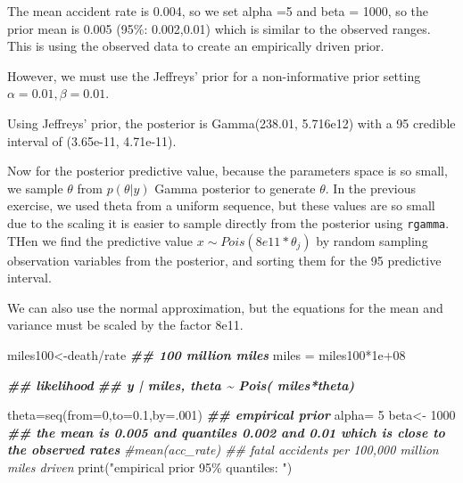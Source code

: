 \documentclass[
]{book}
\newenvironment{Shaded}{\begin{snugshade}}{\end{snugshade}}
\newcommand{\AttributeTok}[1]{\textcolor[rgb]{0.77,0.63,0.00}{#1}}
\newcommand{\CommentTok}[1]{\textcolor[rgb]{0.56,0.35,0.01}{\textit{#1}}}
\newcommand{\DecValTok}[1]{\textcolor[rgb]{0.00,0.00,0.81}{#1}}
\newcommand{\DocumentationTok}[1]{\textcolor[rgb]{0.56,0.35,0.01}{\textbf{\textit{#1}}}}
\newcommand{\FloatTok}[1]{\textcolor[rgb]{0.00,0.00,0.81}{#1}}
\newcommand{\FunctionTok}[1]{\textcolor[rgb]{0.00,0.00,0.00}{#1}}
\newcommand{\NormalTok}[1]{#1}
\newcommand{\OtherTok}[1]{\textcolor[rgb]{0.56,0.35,0.01}{#1}}
\newcommand{\SpecialCharTok}[1]{\textcolor[rgb]{0.00,0.00,0.00}{#1}}
\newcommand{\StringTok}[1]{\textcolor[rgb]{0.31,0.60,0.02}{#1}}
\theoremstyle{definition}
\theoremstyle{definition}
\theoremstyle{definition}
\theoremstyle{definition}
\theoremstyle{remark}
\begin{document}
The mean accident rate is 0.004, so we set alpha =5 and beta = 1000, so the prior mean is 0.005 (95\(\%\): 0.002,0.01) which is similar to the observed ranges. This is using the observed data to create an empirically driven prior.

However, we must use the Jeffreys' prior for a non-informative prior setting \(\alpha=0.01, \beta=0.01\).

Using Jeffreys' prior, the posterior is Gamma(238.01, 5.716e12) with a 95 credible interval of (3.65e-11, 4.71e-11).

Now for the posterior predictive value, because the parameters space is so small, we sample \(\theta\) from \(p(\theta | y)\) Gamma posterior to generate \(\theta\). In the previous exercise, we used theta from a uniform sequence, but these values are so small due to the scaling it is easier to sample directly from the posterior using \texttt{rgamma}. THen we find the predictive value \(x \sim Pois(8e11*\theta_j)\) by random sampling observation variables from the posterior, and sorting them for the 95 predictive interval.

We can also use the normal approximation, but the equations for the mean and variance must be scaled by the factor 8e11.

\begin{Shaded}
\begin{Highlighting}[]
\NormalTok{ miles100}\OtherTok{\textless{}{-}}\NormalTok{death}\SpecialCharTok{/}\NormalTok{rate }\DocumentationTok{\#\# 100 million miles}
\NormalTok{miles }\OtherTok{=}\NormalTok{ miles100}\SpecialCharTok{*}\FloatTok{1e+08}


  
\DocumentationTok{\#\# likelihood   }
\DocumentationTok{\#\# y | miles, theta \textasciitilde{} Pois( miles*theta)}
  
\NormalTok{ theta}\OtherTok{=}\FunctionTok{seq}\NormalTok{(}\AttributeTok{from=}\DecValTok{0}\NormalTok{,}\AttributeTok{to=}\FloatTok{0.1}\NormalTok{,}\AttributeTok{by=}\NormalTok{.}\DecValTok{001}\NormalTok{)}
 \DocumentationTok{\#\# empirical prior}
\NormalTok{  alpha}\OtherTok{=} \DecValTok{5}
\NormalTok{   beta}\OtherTok{\textless{}{-}} \DecValTok{1000}  
   \DocumentationTok{\#\# the mean is 0.005 and quantiles 0.002 and 0.01 which is close to the observed rates }
   \CommentTok{\#mean(acc\_rate) \#\# fatal accidents per 100,000 million miles driven}
   \FunctionTok{print}\NormalTok{(}\StringTok{"empirical prior 95\% quantiles: "}\NormalTok{)}
\end{Highlighting}
\end{Shaded}
\end{document}
